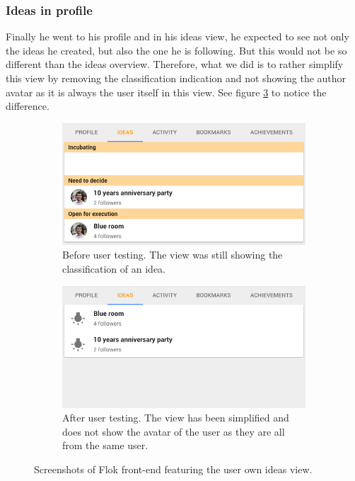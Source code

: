 \documentclass[a4paper,12pt, oneside]{article}
\begin{document}
\subsubsection*{Ideas in profile}
Finally he went to his profile and in his ideas view, he expected to see not only the ideas he created, but also the one he is following.
But this would not be so different than the ideas overview.
Therefore, what we did is to rather simplify this view by removing the classification indication and not showing the author avatar as it is always the user itself in this view.
See figure \ref{fig.tests.personIdeas} to notice the difference.

\begin{figure}[!htb]
    \begin{subfigure}[t]{.495\textwidth}
        \includegraphics[width=\textwidth]{images/user_tests/personIdeas_before.png}
        \caption{Before user testing. The view was still showing the classification of an idea.}
        \label{fig.tests.personIdeas.before}
    \end{subfigure}
    \hfill
    \begin{subfigure}[t]{.495\textwidth}
        \includegraphics[width=\textwidth]{images/user_tests/personIdeas_after.png}
        \caption{After user testing. The view has been simplified and does not show the avatar of the user as they are all from the same user.}
        \label{fig.tests.personIdeas.after}
    \end{subfigure}
    \caption{Screenshots of Flok front-end featuring the user own ideas view.}
    \label{fig.tests.personIdeas}
\end{figure}
\end{document}
